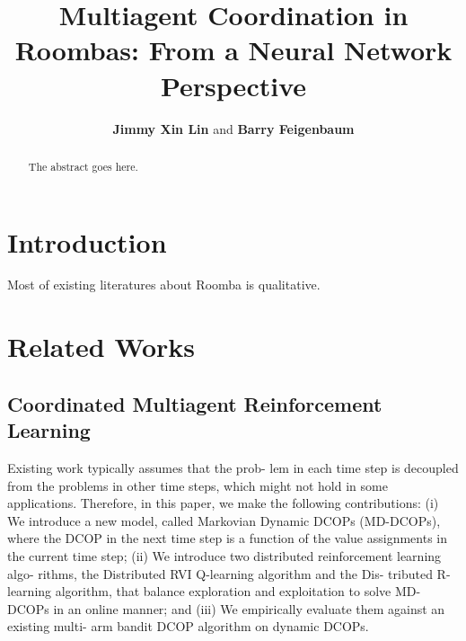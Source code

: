 \documentclass[conference]{IEEEtran}
\begin{document}
%
\title{Multiagent Coordination in Roombas: From a Neural Network Perspective}


\author{\textbf{Jimmy Xin Lin} and \textbf{Barry Feigenbaum}}


\maketitle

\begin{abstract}
The abstract goes here.
\end{abstract}

\IEEEpeerreviewmaketitle



\section{Introduction}
Most of existing literatures about Roomba is qualitative.

\section{Related Works}
\subsection{Coordinated Multiagent Reinforcement Learning}
\cite{nguyen2014decentralized} Existing work typically assumes that the prob- lem in each time step is decoupled from the problems in other time steps, which might not hold in some applications. Therefore, in this paper, we make the following contributions: (i) We introduce a new model, called Markovian Dynamic DCOPs (MD-DCOPs), where the DCOP in the next time step is a function of the value assignments in the current time step; (ii) We introduce two distributed reinforcement learning algo- rithms, the Distributed RVI Q-learning algorithm and the Dis- tributed R-learning algorithm, that balance exploration and exploitation to solve MD-DCOPs in an online manner; and (iii) We empirically evaluate them against an existing multi- arm bandit DCOP algorithm on dynamic DCOPs.
\end{document}
